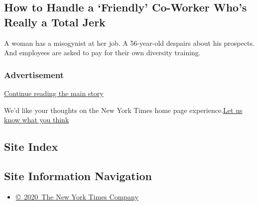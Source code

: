 \hypertarget{how-to-handle-a-friendly-co-worker-whos-really-a-total-jerk}{%
\subsection{How to Handle a `Friendly' Co-Worker Who's Really a Total
Jerk}\label{how-to-handle-a-friendly-co-worker-whos-really-a-total-jerk}}

A woman has a misogynist at her job. A 56-year-old despairs about his
prospects. And employees are asked to pay for their own diversity
training.

\href{/2020/08/07/business/how-to-handle-a-friendly-co-worker-whos-really-a-total-jerk.html}{}

\hypertarget{advertisement}{%
\subsubsection{Advertisement}\label{advertisement}}

\protect\hyperlink{after-dfp-ad-mid1-large}{Continue reading the main
story}

We'd like your thoughts on the New York Times home page
experience.\href{http://nyt.qualtrics.com/jfe/form/SV_eFJmKj9v0krSE0l}{Let
us know what you think}

\hypertarget{site-index}{%
\subsection{Site Index}\label{site-index}}

\hypertarget{site-information-navigation}{%
\subsection{Site Information
Navigation}\label{site-information-navigation}}

\begin{itemize}
\tightlist
\item
  \href{https://help.nytimes3xbfgragh.onion/hc/en-us/articles/115014792127-Copyright-notice}{©~2020~The
  New York Times Company}
\end{itemize}

